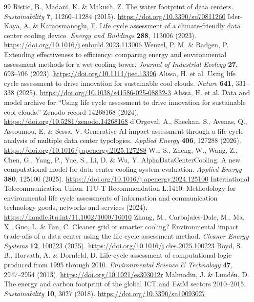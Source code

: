 \documentclass[review,a4paper,fleqn]{cas-sc}
\begin{document}
\begin{thebibliography}{99}
 Ristic, B., Madani, K. \& Makuch, Z. The water footprint of data centers. \textit{Sustainability} \textbf{7}, 11260--11284 (2015). \url{https://doi.org/10.3390/su70811260}
 Isler-Kaya, A. \& Karaosmanoglu, F. Life cycle assessment of a climate-friendly data center cooling device. \textit{Energy and Buildings} \textbf{288}, 113006 (2023). \url{https://doi.org/10.1016/j.enbuild.2023.113006}
 Wenzel, P. M. \& Radgen, P. Extending effectiveness to efficiency: comparing energy and environmental assessment methods for a wet cooling tower. \textit{Journal of Industrial Ecology} \textbf{27}, 693--706 (2023). \url{https://doi.org/10.1111/jiec.13396}
 Alissa, H. et al. Using life cycle assessment to drive innovation for sustainable cool clouds. \textit{Nature} \textbf{641}, 331--338 (2025). \url{https://doi.org/10.1038/s41586-025-08832-3}
 Alissa, H. et al. Data and model archive for ``Using life cycle assessment to drive innovation for sustainable cool clouds.'' Zenodo record 14268168 (2024). \url{https://doi.org/10.5281/zenodo.14268168}
 d'Orgeval, A., Sheehan, S., Avenas, Q., Assoumou, E. \& Sessa, V. Generative AI impact assessment through a life cycle analysis of multiple data center typologies. \textit{Applied Energy} \textbf{406}, 127288 (2026). \url{https://doi.org/10.1016/j.apenergy.2025.127288}
 Wu, S., Zheng, W., Wang, Z., Chen, G., Yang, P., Yue, S., Li, D. \& Wu, Y. AlphaDataCenterCooling: A new computational model for data center cooling system evaluation. \textit{Applied Energy} \textbf{380}, 125100 (2025). \url{https://doi.org/10.1016/j.apenergy.2024.125100}
 International Telecommunication Union. ITU-T Recommendation L.1410: Methodology for environmental life cycle assessments of information and communication technology goods, networks and services (2024). \url{https://handle.itu.int/11.1002/1000/16010}
 Zhang, M., Carbajales-Dale, M., Ma, X., Guo, L. \& Fan, C. Cleaner grid or smarter cooling? Environmental impact trade-offs of a data center using the life cycle assessment method. \textit{Cleaner Energy Systems} \textbf{12}, 100223 (2025). \url{https://doi.org/10.1016/j.cles.2025.100223}
 Boyd, S. B., Horvath, A. \& Dornfeld, D. Life-cycle assessment of computational logic produced from 1995 through 2010. \textit{Environmental Science \& Technology} \textbf{47}, 2947--2954 (2013). \url{https://doi.org/10.1021/es303012r}
 Malmodin, J. \& Lundén, D. The energy and carbon footprint of the global ICT and E\&M sectors 2010--2015. \textit{Sustainability} \textbf{10}, 3027 (2018). \url{https://doi.org/10.3390/su10093027}

\end{thebibliography}
\end{document}
